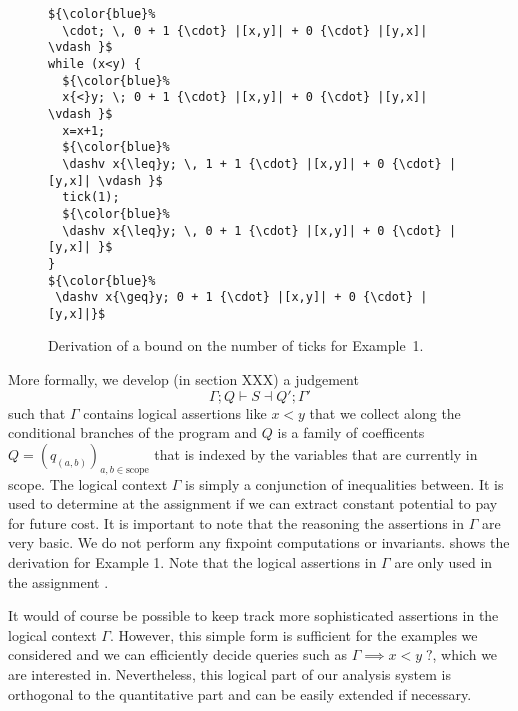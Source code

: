 \documentclass[nocopyrightspace,preprint]{sigplanconf}
\newcommand{\pref}[1]{\prettyref{#1}}
\begin{document}
\begin{figure}[t]
  \centering
\begin{lstlisting}[mathescape]
${\color{blue}%
  \cdot; \, 0 + 1 {\cdot} |[x,y]| + 0 {\cdot} |[y,x]| \vdash }$
while (x<y) {
  ${\color{blue}%
  x{<}y; \; 0 + 1 {\cdot} |[x,y]| + 0 {\cdot} |[y,x]| \vdash }$
  x=x+1; 
  ${\color{blue}%
  \dashv x{\leq}y; \, 1 + 1 {\cdot} |[x,y]| + 0 {\cdot} |[y,x]| \vdash }$
  tick(1);
  ${\color{blue}%
  \dashv x{\leq}y; \, 0 + 1 {\cdot} |[x,y]| + 0 {\cdot} |[y,x]| }$
}
${\color{blue}%
 \dashv x{\geq}y; 0 + 1 {\cdot} |[x,y]| + 0 {\cdot} |[y,x]|}$
\end{lstlisting}
  \caption{Derivation of a bound on the number of ticks for Example~1.}
  \label{fig:ex1}
\end{figure}
More formally, we develop (in section XXX) a judgement 
$$
\Gamma; Q \vdash S \dashv Q'; \Gamma'
$$
such that $\Gamma$ contains logical assertions like $x<y$ that we
collect along the conditional branches of the program and $Q$ is a
family of coefficents $Q = (q_{(a,b)})_{a,b \in \text{scope}}$ that is
indexed by the variables that are currently in scope.  The logical
context $\Gamma$ is simply a conjunction of inequalities between.  It
is used to determine at the assignment if we can extract constant
potential to pay for future cost.  It is important to note that the
reasoning the assertions in $\Gamma$ are very basic.  We do not
perform any fixpoint computations or invariants.  \pref{fig:ex1} shows
the derivation for Example 1.  Note that the logical assertions in
$\Gamma$ are only used in the assignment .

It would of course be possible to keep track more sophisticated
assertions in the logical context $\Gamma$.  However, this simple form
is sufficient for the examples we considered and we can efficiently
decide queries such as $\Gamma \implies x<y \; ?$, which we are
interested in.  Nevertheless, this logical part of our analysis system
is orthogonal to the quantitative part and can be easily extended if
necessary.
\end{document}
